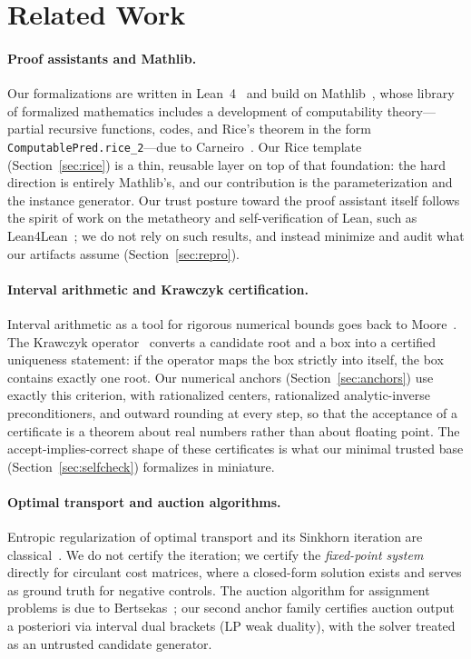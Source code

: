 \documentclass[11pt]{article}
\theoremstyle{definition}
\theoremstyle{remark}
\newcommand{\lean}[1]{\texttt{#1}}
\begin{document}
\section{Related Work}\label{sec:related}

\paragraph{Proof assistants and Mathlib.}
Our formalizations are written in Lean~4~\cite{lean4} and build on
Mathlib~\cite{mathlib}, whose library of formalized mathematics includes a
development of computability theory---partial recursive functions, codes, and
Rice's theorem in the form \lean{ComputablePred.rice\_2}---due to
Carneiro~\cite{carneiro2019}. Our Rice template
(Section~\ref{sec:rice}) is a thin, reusable layer on top of that foundation:
the hard direction is entirely Mathlib's, and our contribution is the
parameterization and the instance generator. Our trust posture toward the
proof assistant itself follows the spirit of work on the metatheory and
self-verification of Lean, such as Lean4Lean~\cite{lean4lean}; we do not
rely on such results, and instead minimize and audit what our artifacts
assume (Section~\ref{sec:repro}).

\paragraph{Interval arithmetic and Krawczyk certification.}
Interval arithmetic as a tool for rigorous numerical bounds goes back to
Moore~\cite{moore1966}. The Krawczyk operator~\cite{krawczyk1969} converts a
candidate root and a box into a certified uniqueness statement: if the
operator maps the box strictly into itself, the box contains exactly one
root. Our numerical anchors (Section~\ref{sec:anchors}) use exactly this
criterion, with rationalized centers, rationalized analytic-inverse
preconditioners, and outward rounding at every step, so that the acceptance
of a certificate is a theorem about real numbers rather than about floating
point. The accept-implies-correct shape of these certificates is what our
minimal trusted base (Section~\ref{sec:selfcheck}) formalizes in miniature.

\paragraph{Optimal transport and auction algorithms.}
Entropic regularization of optimal transport and its Sinkhorn iteration are
classical~\cite{sinkhorn1967,cuturi2013}. We do not certify the iteration;
we certify the \emph{fixed-point system} directly for circulant cost
matrices, where a closed-form solution exists and serves as ground truth for
negative controls. The auction algorithm for assignment problems is due to
Bertsekas~\cite{bertsekas1988}; our second anchor family certifies auction
output a posteriori via interval dual brackets (LP weak duality), with the
solver treated as an untrusted candidate generator.
\end{document}
